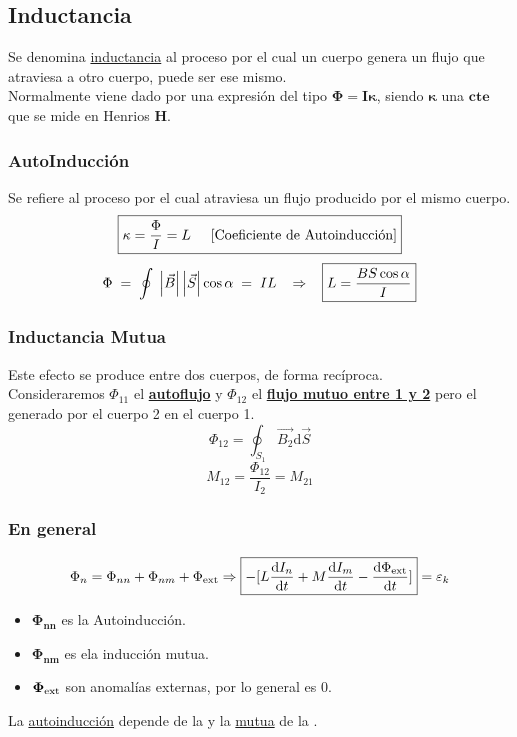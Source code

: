 \subsection{Inductancia}
\noindent Se denomina \underline{inductancia} al proceso por el cual un cuerpo genera un flujo que atraviesa a otro cuerpo, puede ser ese mismo.\\
Normalmente viene dado por una expresión del tipo \(\mathbf{\Phi = I \kappa}\), siendo \(\mathbf{\kappa}\) una \(\mathbf{cte}\) que se mide en Henrios \textbf{H}.
\subsubsection{AutoInducción}
\noindent Se refiere al proceso por el cual atraviesa un flujo producido por el mismo cuerpo.
\[
        \boxed{\kappa = \frac{\Phi}{I} = L \hspace{5mm} \textnormal{[Coeficiente de Autoinducción]}}
\]
\[
        \Phi \hspace{1mm}=\hspace{1mm} \oint \hspace{1mm}\left | \vec{B} \right |\left |\vec{S} \right | \cos{\alpha}\hspace{1mm} = \hspace{1mm}IL \hspace{3mm}\Rightarrow \hspace{3mm} \boxed{L = \frac{BS\cos{\alpha}}{I}}
\]
\subsubsection{Inductancia Mutua}
\noindent Este efecto se produce entre dos cuerpos, de forma recíproca.\\
Consideraremos \(\Phi_{11}\) el \underline{\textbf{autoflujo}} y \(\Phi_{12}\) el \underline{\textbf{flujo mutuo entre 1 y 2}} pero el generado por el cuerpo 2 en el cuerpo 1.
\[
        \Phi_{12} = \oint_{S_1} \vec{B_2}\mathrm{d}\vec{S}
\]
\[
        \boxed{M_{12} = \frac{\Phi_{12}}{I_2} = M_{21}}
\]
\subsubsection{En general}
\[
        \Phi_n = \Phi_{nn} + \Phi_{nm} +\Phi_{\textnormal{ext}}
        \Rightarrow
        \boxed{-[L \frac{\mathrm{d}I_n}{\mathrm{d}t}+M\frac{\mathrm{d}I_m}{\mathrm{d}t} - \frac{\mathrm{d}\Phi_{\textnormal{ext}}}{\mathrm{d}t}]} = \varepsilon_k
\]
\begin{itemize}
        \item \(\mathbf{\Phi_{nn}}\) es la Autoinducción.
              \item\(\mathbf{\Phi_{nm}}\) es ela inducción mutua.
              \item\(\mathbf{\Phi_{\textnormal{ext}}}\) son anomalías externas, por lo general es 0.
\end{itemize}
\noindent La \underline{autoinducción} depende de la  y la \underline{mutua} de la .
